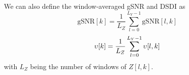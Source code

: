 We can also define the window-averaged gSNR and DSDI as
\begin{equation}
	\text{gSNR}[k] = \frac{1}{L_Z}\sum_{l=0}^{L_Y-1} \text{gSNR}[l,k]
\end{equation}
\begin{equation}
	\upsilon[k] = \frac{1}{L_Z}\sum_{l=0}^{L_Y-1} \upsilon[l,k]
\end{equation}
with $L_Z$ being the number of windows of $Z[l,k]$.
%

